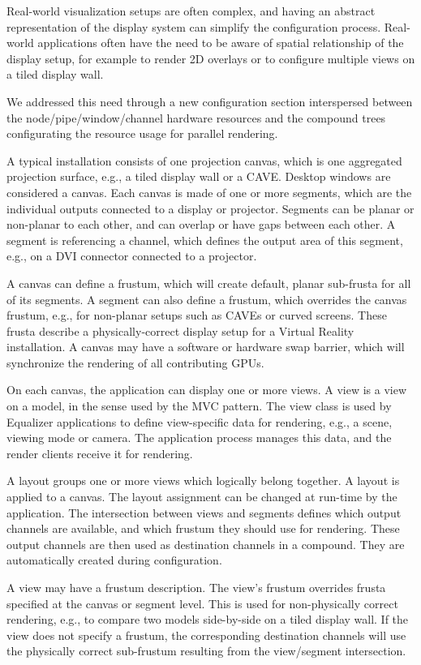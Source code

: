\documentclass[journal]{vgtc}                %
\begin{document}
Real-world visualization setups are often complex, and having an abstract
representation of the display system can simplify the configuration
process. Real-world applications often have the need to be aware of spatial
relationship of the display setup, for example to render 2D overlays or to
configure multiple views on a tiled display wall.

We addressed this need through a new configuration section interspersed between
the node/pipe/window/channel hardware resources and the compound trees
configurating the resource usage for parallel rendering.

A typical installation consists of one projection canvas, which is one
aggregated projection surface, e.g., a tiled display wall or a CAVE. Desktop
windows are considered a canvas. Each canvas is made of one or more segments,
which are the individual outputs connected to a display or projector. Segments
can be planar or non-planar to each other, and can overlap or have gaps between
each other. A segment is referencing a channel, which defines the output area of
this segment, e.g., on a DVI connector connected to a projector.

A canvas can define a frustum, which will create default, planar sub-frusta for
all of its segments. A segment can also define a frustum, which overrides the
canvas frustum, e.g., for non-planar setups such as CAVEs or curved
screens. These frusta describe a physically-correct display setup for a Virtual
Reality installation. A canvas may have a software or hardware swap barrier,
which will synchronize the rendering of all contributing GPUs.

On each canvas, the application can display one or more views. A view is a view
on a model, in the sense used by the MVC pattern. The view class is used by
Equalizer applications to define view-specific data for rendering, e.g., a
scene, viewing mode or camera. The application process manages this data, and
the render clients receive it for rendering.

A layout groups one or more views which logically belong together. A layout is
applied to a canvas. The layout assignment can be changed at run-time by the
application. The intersection between views and segments defines which output
channels are available, and which frustum they should use for rendering. These
output channels are then used as destination channels in a compound. They are
automatically created during configuration.

A view may have a frustum description. The view's frustum overrides frusta
specified at the canvas or segment level. This is used for non-physically
correct rendering, e.g., to compare two models side-by-side on a tiled display
wall. If the view does not specify a frustum, the corresponding destination
channels will use the physically correct sub-frustum resulting from the
view/segment intersection.
\end{document}
